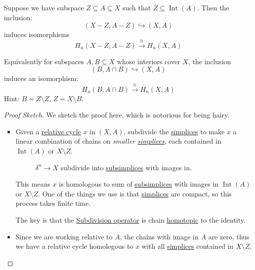\begin{theorem}[Excision]\label{thm:excision}
	Suppose we have subspace $Z \subseteq A \subseteq X$ such that $\overline{Z} \subseteq \operatorname{Int} (A)$. Then the inclusion:
	\[
		(X - Z, A - Z) \hookrightarrow (X, A)
	\]
	induces isomorphisms
	\[
		H_n(X - Z, A - Z) \xrightarrow{\cong} H_n(X, A)
	\]
\end{theorem}

\begin{exercise}
	Equivalently for subspaces $A, B \subseteq X$ whose interiors cover $X$, the inclusion
	\[
		(B, A \cap B) \hookrightarrow (X, A)
	\]
	induces an isomorphism:
	\[
		H_n(B, A \cap B) \xrightarrow{\cong} H_n(X, A)
	\]
	Hint: $B = Z \setminus Z$, $Z = X \setminus B$.
\end{exercise}
\begin{figure}[H]
	\centering
	\label{fig:eg:excision-1}
\end{figure}

\begin{proof}[Proof Sketch]
	We sketch the proof here, which is notorious for being hairy.
	\begin{itemize}
		\item Given a \hyperref[def:relative-cycle]{relative cycle} $x$ in $(X, A)$, subdivide the \hyperref[def:standard-simplex]{simplices} to make $x$ a
		      linear combination of chains on \emph{smaller \hyperref[def:standard-simplex]{simplices}}, each contained in $\operatorname{Int}(A)$ or $X \setminus Z$.
		      \begin{figure}[H]
			      \centering
			      \caption{\(\delta ^n\to X\) subdivide into \hyperref[def:subsimplex]{subsimplices} with images in. }
			      \label{fig:pf:excision}
		      \end{figure}
		      This means $x$ is homologous to sum of \hyperref[def:subsimplex]{subsimplices} with images in $\operatorname{Int}(A)$ or $X \setminus Z$. One of the things we
		      use is that \hyperref[def:standard-simplex]{simplices} are compact, so this process takes finite time.

		      The key is that the \underline{Subdivision operator} is chain \hyperref[def:homotopic]{homotopic} to the identity.
		\item Since we are working relative to $A$, the chains with image in $A$ are zero, thus we have a relative cycle homologous to $x$
		      with all \hyperref[def:standard-simplex]{simplices} contained in $X \setminus Z$.
	\end{itemize}
\end{proof}

